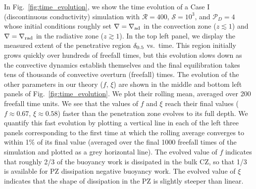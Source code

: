 \documentclass[twocolumn]{aastex631}
\newcommand{\gradrad}{\ensuremath{\nabla_{\rm{rad}}}}
\newcommand{\gradad}{\ensuremath{\nabla_{\rm{ad}}}}
\newcommand{\justgrad}{\ensuremath{\nabla}}
\newcommand{\mP}{\ensuremath{\mathcal{P}}}
\newcommand{\mR}{\ensuremath{\mathcal{R}}}
\newcommand{\mS}{\ensuremath{\mathcal{S}}}
\begin{document}


In Fig.~\ref{fig:time_evolution}, we show the time evolution of a Case I (discontinuous conductivity) simulation with $\mR = 400$, $\mS = 10^3$, and $\mP_D = 4$ whose initial conditions roughly set $\justgrad = \gradad$ in the convection zone ($z \lesssim 1$) and $\justgrad = \gradrad$ in the radiative zone ($z \gtrsim 1$).
In the top left panel, we display the measured extent of the penetrative region $\delta_{\rm{0.5}}$ vs.~time.
This region initially grows quickly over hundreds of freefall times, but this evolution slows down as the convective dynamics establish themselves and the final equilibration takes tens of thousands of convective overturn (freefall) times.
The evolution of the other parameters in our theory ($f$, $\xi$) are shown in the middle and bottom left panels of Fig.~\ref{fig:time_evolution}.
We plot their rolling mean, averaged over 200 freefall time units. 
We see that the values of $f$ and $\xi$ reach their final values ($f \approx 0.67$, $\xi \approx 0.58$) faster than the penetration zone evolves to its full depth.
We quantify this fast evolution by plotting a vertical line in each of the left three panels corresponding to the first time at which the rolling average converges to within 1\% of its final value (averaged over the final 1000 freefall times of the simulation and plotted as a grey horizontal line).
The evolved value of $f$ indicates that roughly 2/3 of the buoyancy work is dissipated in the bulk CZ, so that 1/3 is available for PZ dissipation negative buoyancy work.
The evolved value of $\xi$ indicates that the shape of dissipation in the PZ is slightly steeper than linear.
\end{document}
